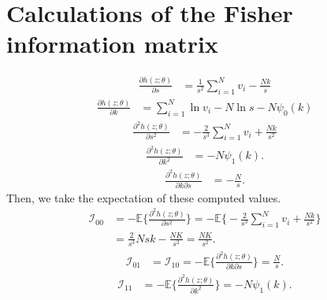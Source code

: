\documentclass[final]{aomart}
\newtheorem[{}\it]{thm}{Theorem}[section]
\theoremstyle{definition}
\newtheorem*[{}\it]{notation}{Notation}
\numberwithin{equation}{section}
\newcommand{\fisher}{\mathcal{I}} %
\begin{document}
\section{Calculations of the Fisher information matrix}
\label{fisher_information}
\begin{align}
\frac{\partial h(z;\theta)}{\partial s} & = \frac{1}{s^2}\sum_{i=1}^{N}v_i - \frac{Nk}{s}
\end{align}
\begin{align}
\frac{\partial h(z;\theta)}{\partial k} & = \sum_{i=1}^{N}\ln v_i - N\ln s - N\psi_0(k)
\end{align}
\begin{align}
\frac{\partial^2h(z;\theta)}{\partial s^2} & = -\frac{2}{s^3}\sum_{i=1}^{N}v_i + \frac{Nk}{s^2}
\label{00}
\end{align}
\begin{align}
\frac{\partial^2 h(z; \theta)}{\partial k^2} & = -N\psi_1(k).
\label{11}
\end{align}
\begin{align}
\frac{\partial^2 h(z; \theta)}{\partial k\partial s} & = -\frac{N}{s} .
\end{align}
Then, we take the expectation of these computed values.
\begin{align}
\fisher_{00} & = -\mathbb{E}\bigg\{ \frac{\partial^2 h(z;\theta)}{\partial s^2} \bigg\} = -\mathbb{E}\bigg\{ -\frac{2}{s^3}\sum_{i=1}^{N}v_i + \frac{Nk}{s^2} \bigg\}\\
& = \frac{2}{s^3}Nsk - \frac{NK}{s^2} = \frac{NK}{s^2}.
\end{align}
\begin{align}
\fisher_{01} & = \fisher_{10} =  -\mathbb{E}\bigg\{ \frac{\partial^2 h(z;\theta)}{\partial k \partial s} \bigg\} = \frac{N}{s}.
\end{align}
\begin{align}
\fisher_{11} & = -\mathbb{E}\bigg\{ \frac{\partial^2 h(z;\theta)}{\partial k^2} \bigg\} = -N\psi_1(k).
\end{align}


\end{document}
